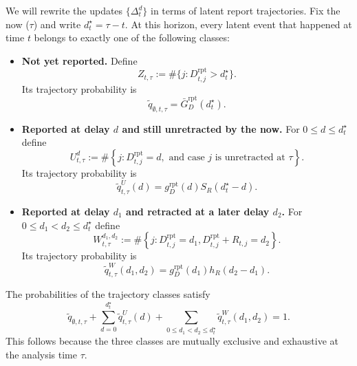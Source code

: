 \documentclass{article}
\theoremstyle{definition}
\theoremstyle{remark}
\begin{document}
We will rewrite the updates $\{\Delta^d_t\}$ in terms of latent report trajectories. Fix the now ($\tau$) and write $d_t^{\star}=\tau-t$. At this horizon, every latent event that happened at time $t$ belongs to exactly one of the following classes:
\begin{itemize}
    \item \textbf{Not yet reported.} Define
    \begin{equation}
        Z_{t,\tau}
        :=
        \#\{j:D^{\mathrm{rpt}}_{t,j}>d_t^{\star}\}.
    \end{equation}
    Its trajectory probability is
    \begin{equation}\label{qemptycum}
        \tilde q_{\emptyset,t,\tau}
        =
        \bar G_D^{\mathrm{rpt}}(d_t^{\star}).
    \end{equation}

    \item \textbf{Reported at delay $d$ and still unretracted by the now.} For $0\leq d\leq d_t^{\star}$ define
    \begin{equation}\label{Udef}
        U_{t,\tau}^{d}
        :=
        \#\left\{
        j:
        D^{\mathrm{rpt}}_{t,j}=d,
        \text{ and case }j\text{ is unretracted at }\tau
        \right\}.
    \end{equation}
    Its trajectory probability is
    \begin{equation}\label{qUcum}
        \tilde q_{t,\tau}^{U}(d)
        =
        g_D^{\mathrm{rpt}}(d)
        S_R(d_t^{\star}-d).
    \end{equation}

    \item \textbf{Reported at delay $d_1$ and retracted at a later delay $d_2$.} For $0\leq d_1<d_2\leq d_t^{\star}$ define
    \begin{equation}\label{Wdef}
        W_{t,\tau}^{d_1,d_2}
        :=
        \#\left\{
        j:
        D^{\mathrm{rpt}}_{t,j}=d_1,
        D^{\mathrm{rpt}}_{t,j}+R_{t,j}=d_2
        \right\}.
    \end{equation}
    Its trajectory probability is
    \begin{equation}\label{qWcum}
        \tilde q_{t,\tau}^{W}(d_1,d_2)
        =
        g_D^{\mathrm{rpt}}(d_1)
        h_R(d_2-d_1).
    \end{equation}
\end{itemize}
The probabilities of the trajectory classes satisfy
\begin{equation}\label{trajectorypartition}
    \tilde q_{\emptyset,t,\tau}
    +
    \sum_{d=0}^{d_t^{\star}}\tilde q_{t,\tau}^{U}(d)
    +
    \sum_{0\leq d_1<d_2\leq d_t^{\star}}
    \tilde q_{t,\tau}^{W}(d_1,d_2)
    =1.
\end{equation}
This follows because the three classes are mutually exclusive and exhaustive at the analysis time $\tau$.
\end{document}
